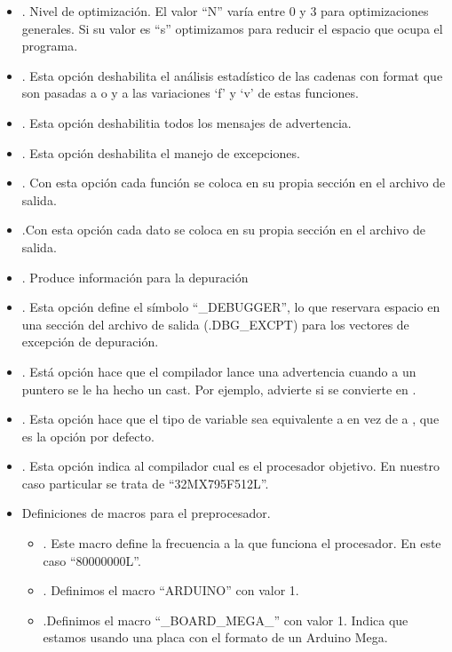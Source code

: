 \begin{itemize}
    \item {}. Nivel de optimización. El valor ``N'' varía entre 0 y 3 para optimizaciones generales. Si su valor es ``s'' optimizamos para reducir el espacio que ocupa el programa.
    \item {}. Esta opción deshabilita el análisis estadístico de las cadenas con format que son pasadas a  o  y a las variaciones `f' y `v' de estas funciones.
    \item {}. Esta opción deshabilitia todos los mensajes de advertencia.
    \item {}. Esta opción deshabilita el manejo de excepciones.
    \item {}. Con esta opción cada función se coloca en su propia sección en el archivo de salida.
    \item {}.Con esta opción cada dato se coloca en su propia sección en el archivo de salida.
    \item {}. Produce información para la depuración
    \item {}. Esta opción define el símbolo ``\_DEBUGGER'', lo que reservara espacio en una sección del archivo de salida (.DBG\_EXCPT) para los vectores de excepción de depuración.
    \item {}. Está opción hace que el compilador lance una advertencia cuando a un puntero se le ha hecho un cast. Por ejemplo, advierte si  se convierte en .
    \item {}. Esta opción hace que el tipo de variable  sea equivalente a  en vez de a , que es la opción por defecto.
    \item {}. Esta opción indica al compilador cual es el procesador objetivo. En nuestro caso particular se trata de ``32MX795F512L''.
    \item Definiciones de macros para el preprocesador.
    \begin{itemize}
        \item {}. Este macro define la frecuencia a la que funciona el procesador. En este caso ``80000000L''.
        \item {}. Definimos el macro ``ARDUINO'' con valor 1.
        \item {}.Definimos el macro ``\_BOARD\_MEGA\_'' con valor 1. Indica que estamos usando una placa con el formato de un Arduino Mega.

\end{itemize}
\end{itemize}
